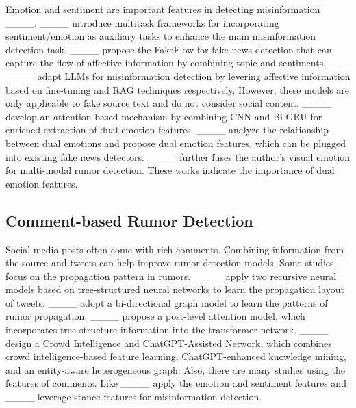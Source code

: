 Emotion and sentiment are important features in detecting misinformation ____. 
____ introduce multitask frameworks for incorporating sentiment/emotion as auxiliary tasks to enhance the main misinformation detection task. ____ propose the FakeFlow for fake news detection that can capture the flow of affective information by combining topic and sentiments. ____ adapt LLMs for misinformation detection by levering affective information based on fine-tuning and RAG techniques respectively. However, these models are only applicable to fake source text and do not consider social content. ____ develop an attention-based mechanism by combining CNN and Bi-GRU for enriched extraction of dual emotion features. ____ analyze the relationship between dual emotions and propose dual emotion features, which can be plugged into existing fake news detectors. ____ further fuses the author's visual emotion for multi-modal rumor detection. These works indicate the importance of dual emotion features. 

\subsection{Comment-based Rumor Detection}

Social media posts often come with rich comments. Combining information from the source and tweets can help improve rumor detection models. Some studies focus on the propagation pattern in rumors. ____ apply two recursive neural models based on tree-structured neural networks to learn the propagation layout of tweets. ____ adopt a bi-directional graph model to learn the patterns of rumor propagation. ____ propose a post-level attention model, which incorporates tree structure information into the transformer network.  ____ design a Crowd Intelligence and ChatGPT-Assisted Network, which combines crowd intelligence-based feature learning, ChatGPT-enhanced knowledge mining, and an entity-aware heterogeneous graph. Also, there are many studies using the features of comments. Like ____ apply the emotion and sentiment features and ____ leverage stance features for misinformation detection.


